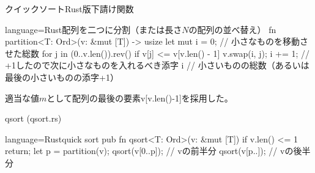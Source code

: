 \documentclass{beamer}
\begin{document}
\begin{frame}[fragile]{クイックソートRust版下請け関数}{}
\begin{codeof}{language=Rust}{配列を二つに分割（または長さ$N$の配列の並べ替え）}
fn partition<T: Ord>(v: &mut [T]) -> usize {
    let mut i = 0;      // 小さなものを移動させた総数
    for j in (0..v.len()).rev() {
        if v[j] <= v[v.len() - 1] {
            v.swap(i, j);
            i += 1;  // +1したので次に小さなものを入れるべき添字
        }
    }
    i   // 小さいものの総数（あるいは最後の小さいものの添字+1）
}
\end{codeof}
\vfill
適当な値$m$として配列の最後の要素v[v.len()-1]を採用した。
\end{frame}

\begin{frame}[fragile]{qsort (qsort.rs)}{}
\begin{codeof}{language=Rust}{quick sort}
pub fn qsort<T: Ord>(v: &mut [T]) {
    if v.len() <= 1 { return; }
    let p = partition(v);
    qsort(v[0..p]);     // vの前半分
    qsort(v[p..]);      // vの後半分
}
\end{codeof}
\end{frame}
\end{document}
